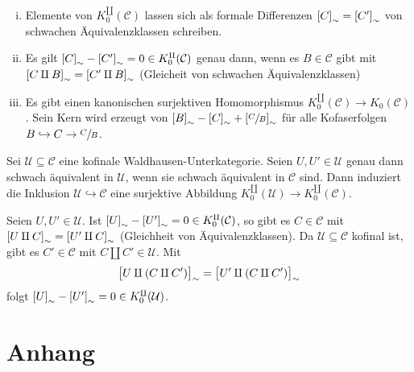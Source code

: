 \begin{bemerkung}
	\begin{enumerate}[(i)]
		\item Elemente von $K_0^\amalg(\mathcal{C})$ lassen sich als formale Differenzen $\benbrace*{C}_\sim = \benbrace*{C'}_\sim$ von schwachen Äquivalenzklassen schreiben.
		\item Es gilt $\benbrace*{C}_\sim - \benbrace*{C'}_\sim =0 \in K^\amalg_0(\mathcal{C})$ genau dann, wenn es $B \in \mathcal{C}$ gibt mit $\benbrace*{C \amalg B}_\sim = \benbrace*{C' \amalg B}_\sim $ (Gleicheit von schwachen Äquivalenzklassen)
		\item Es gibt einen kanonischen surjektiven Homomorphismus $K_0^\amalg(\mathcal{C}) \to K_0(\mathcal{C})$.
		Sein Kern wird erzeugt von $\benbrace*{B}_\sim - \benbrace*{C}_\sim  + \benbrace*{\sfrac{C}{B}}_\sim$ für alle Kofaserfolgen $B \hookrightarrow C \to \sfrac{C}{B}$.
	\end{enumerate}
\end{bemerkung}



\begin{lemma}
	Sei $\mathcal{U} \subseteq \mathcal{C}$ eine kofinale Waldhausen-Unterkategorie.
	Seien $U, U' \in \mathcal{U}$ genau dann schwach äquivalent in $\mathcal{U}$, wenn sie schwach äquivalent in $\mathcal{C}$ sind.
	Dann induziert die Inklusion $\mathcal{U} \hookrightarrow \mathcal{C}$ eine surjektive Abbildung $K_0^\amalg(\mathcal{U}) \to K_0^\amalg(\mathcal{C})$.
\end{lemma}
\begin{beweis}
	Seien $U,U' \in \mathcal{U}$.
	Ist $\benbrace*{U}_\sim - \benbrace*{U'}_\sim =0 \in K_0^\amalg(\mathcal{C})$, so gibt es $C \in \mathcal{C}$ mit $\benbrace*{U \amalg C}_\sim = \benbrace*{U' \amalg C}_\sim$ (Gleichheit von Äquivalenzklassen).
	Da $\mathcal{U} \subseteq \mathcal{C}$ kofinal ist, gibt es $C' \in \mathcal{C}$ mit $C \amalg C' \in \mathcal{U}$.
	Mit
	\[
		\benbrace[\big]{U \amalg (C \amalg C')}_\sim = \benbrace[\big]{U' \amalg (C \amalg C')}_\sim
	\]
	folgt $\benbrace*{U}_\sim - \benbrace*{U'}_\sim =0 \in K_0^\amalg(\mathcal{U})$.
\end{beweis}



\cleardoubleoddemptypage
{}
\setcounter{page}{1}
\cleardoubleoddemptypage
\appendix

\section{Anhang} %
\label{sec:anhang}

\printindex
\printbibliography
\listoffigures
\todototoc
{}

